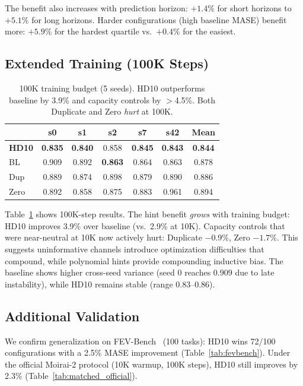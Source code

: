 \documentclass[letterpaper]{article}
\begin{document}
The benefit also increases with prediction horizon: $+1.4\%$ for short horizons to $+5.1\%$ for long horizons. Harder configurations (high baseline MASE) benefit more: $+5.9\%$ for the hardest quartile vs.\ $+0.4\%$ for the easiest.

\subsection{Extended Training (100K Steps)}

\begin{table}[t]
\centering
\caption{100K training budget (5 seeds). HD10 outperforms baseline by 3.9\% and capacity controls by $>$4.5\%. Both Duplicate and Zero \emph{hurt} at 100K.}
\label{tab:100k}
\small
\begin{tabular}{@{}lcccccc@{}}
\toprule
& \textbf{s0} & \textbf{s1} & \textbf{s2} & \textbf{s7} & \textbf{s42} & \textbf{Mean} \\
\midrule
\textbf{HD10} & \textbf{0.835} & \textbf{0.840} & 0.858 & \textbf{0.845} & \textbf{0.843} & \textbf{0.844} \\
BL & 0.909 & 0.892 & \textbf{0.863} & 0.864 & 0.863 & 0.878 \\
Dup & 0.889 & 0.874 & 0.898 & 0.879 & 0.890 & 0.886 \\
Zero & 0.892 & 0.858 & 0.875 & 0.883 & 0.961 & 0.894 \\
\bottomrule
\end{tabular}
\end{table}

Table~\ref{tab:100k} shows 100K-step results. The hint benefit \emph{grows} with training budget: HD10 improves 3.9\% over baseline (vs.\ 2.9\% at 10K). Capacity controls that were near-neutral at 10K now actively hurt: Duplicate $-0.9\%$, Zero $-1.7\%$. This suggests uninformative channels introduce optimization difficulties that compound, while polynomial hints provide compounding inductive bias. The baseline shows higher cross-seed variance (seed 0 reaches 0.909 due to late instability), while HD10 remains stable (range 0.83--0.86).

\subsection{Additional Validation}

We confirm generalization on FEV-Bench~\citep{vijay2024gifteval} (100 tasks): HD10 wins 72/100 configurations with a 2.5\% MASE improvement (Table~\ref{tab:fevbench}). Under the official Moirai-2 protocol (10K warmup, 100K steps), HD10 still improves by 2.3\% (Table~\ref{tab:matched_official}).
\end{document}
